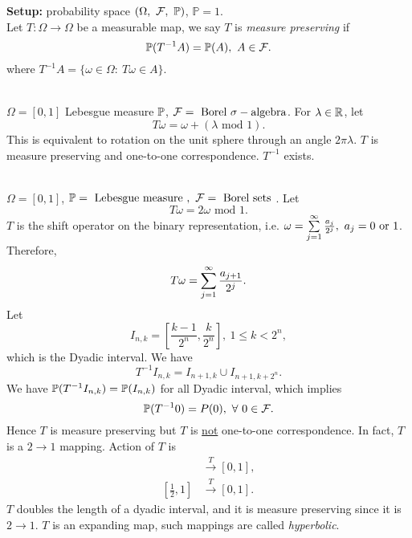\np \textbf{Setup:} probability space $(\Omega,\ \Fs,\ \mathbb{P})$, $\mathbb{P} = 1$.\\
Let $T: \Omega \to \Omega$ be a measurable map, we say $T$ is \textit{measure preserving} if
\begin{equation*}
    \P(T^{-1} A) = \P(A),\ A \in \Fs.
\end{equation*}
where $T^{-1}A = \{\omega \in \Omega:\ T \omega \in A\}$. 

\begin{example}\ \\
$\Omega = [0,1]$ Lebesgue measure $\P$, $\Fs = \text{ Borel } \sigma-\text{algebra}$. For $\lambda \in \R$, let
\begin{equation*}
    T \omega = \omega + (\lambda \text{ mod } 1).
\end{equation*}
This is equivalent to rotation on the unit sphere through an angle $2\pi \lambda$. $T$ is measure preserving and one-to-one correspondence. $T^{-1}$ exists.
\end{example}

\begin{example}\ \\
$\Omega = [0,1]$, $\P = \text{ Lebesgue measure },\ \Fs = \text{ Borel sets }$. Let
\begin{equation*}
    T \omega = 2 \omega \text{ mod } 1.
\end{equation*}
$T$ is the shift operator on the binary representation, i.e. $\omega = \summ{j=1}\infty \frac{a_j}{2^j},\ a_j = 0 \text{ or } 1$. Therefore,
\begin{equation*}
    T \omega = \summ{j = 1}\infty \frac{a_{j + 1}}{2^j}.
\end{equation*}
Let
\begin{equation*}
    I_{n,k} = [\frac{k - 1}{2^n}, \frac{k}{2^n}],\ 1 \leq k < 2^n,
\end{equation*}
which is the Dyadic interval. We have
\begin{equation*}
    T^{-1} I_{n,k} = I_{n+1,k} \cup I_{n+1, k+ 2^n}.
\end{equation*}
We have $\P(T^{-1} I_{n,k}) = \P(I_{n,k})$ for all Dyadic interval, which implies
\begin{equation*}
    \P(T^{-1} 0) = P(0),\ \forall\ 0 \in \Fs.
\end{equation*}
Hence $T$ is measure preserving but $T$ is \underline{not} one-to-one correspondence. In fact, $T$ is a $2 \to 1$ mapping. Action of $T$ is
\begin{align*}
    [0,\frac{1}{2}] &\overset{T}{\to} [0,1],\\
    [\frac{1}{2},1] &\overset{T}{\to} [0,1].
\end{align*}
$T$ doubles the length of a dyadic interval, and it is measure preserving since it is $2 \to 1$. $T$ is an expanding map, such mappings are called \textit{hyperbolic}.
\end{example}

